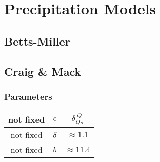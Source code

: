 \documentclass[10pt]{article}
\begin{document}
\section{Precipitation Models}
\subsection{Betts-Miller}
\subsection{Craig \& Mack}
\subsubsection{Parameters}
\begin{center}
	\begin{tabular}{||c |c|c|| } 
		\hline
		not fixed & $\epsilon$ &   $\delta \frac{Q}{Qs}$ \\ \hline
		not fixed & $\delta$ & $ \approx 1.1$  \\ \hline
		not fixed & $b$& $ \approx 11.4$\\ \hline
		
	\end{tabular}
\end{center}
\end{document}
